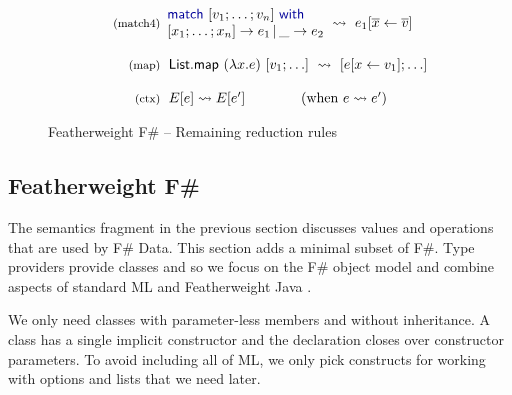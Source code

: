 \documentclass[10pt,preprint,clearpagebib]{sigplanconf}
\newcommand{\kvd}[1]{\textnormal{\textcolor{kvdclr}{\sffamily #1}}}
\newcommand{\ident}[1]{\textnormal{\sffamily #1}}
\newcommand{\reduce}{\rightsquigarrow}
\begin{document}
\begin{figure}
\begin{equation*}
\begin{array}{rl}
 \textnormal{\footnotesize{(match4)}}&
 \hspace{-1em}
 \begin{array}{l}
  \kvd{match}~[v_1;\ldots;v_n]~\kvd{with} \\[0em]
  [x_1;\ldots;x_n ] \rightarrow e_1 \,|\, \_ \rightarrow e_2
 \end{array} \hspace{-0.5em} ~\reduce~ e_1[\overline{x}\leftarrow\overline{v}] \\
 \\
 \textnormal{\footnotesize{(map)}}&
 \hspace{-0.4em}
 \ident{List.map}~(\lambda x.e)~[v_1; \ldots] ~\reduce~ [e[x\leftarrow v_1]; \ldots] \\
 \\
 \textnormal{\footnotesize{(ctx)}}&
 \hspace{-0.4em}
  E[e] \reduce E[e'] \qquad\qquad(\textnormal{when}~e \reduce e')\\
\end{array}
\end{equation*}

\caption{Featherweight F\# -- Remaining reduction rules}
\label{fig:ff-reduction}
\vspace{-1em}
\end{figure}


\subsection{Featherweight F\#}
\label{sec:formal-ff}

The semantics fragment in the previous section discusses values and operations that are used by
F\# Data. This section adds a minimal subset of F\#. Type providers provide classes and so we focus
on the F\# object model and combine aspects of standard ML \cite{sml} and Featherweight Java \cite{fwjava}. 

We only need classes with parameter-less members and without inheritance. A class has a single 
implicit constructor and the declaration closes over constructor parameters. To avoid including all 
of ML, we only pick constructs for working with options and lists that we need later.
\end{document}
